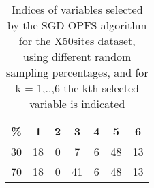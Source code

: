 \begin{table}
	\begin{center}
		\begin{tabular}{c c c c c c c}
			\% & 1 & 2 & 3 & 4 & 5 & 6 \\
			\hline
			30 & 18 & 0 & 7 & 6 & 48 & 13 \\
			70 & 18 & 0 & 41 & 6 & 48 & 13 \\
		\end{tabular}
	\end{center}
	\caption{Indices of variables selected by the SGD-OPFS algorithm for the X50sites dataset, using different random sampling percentages, and for k = 1,..,6 the kth selected variable is indicated}
\end{table}
